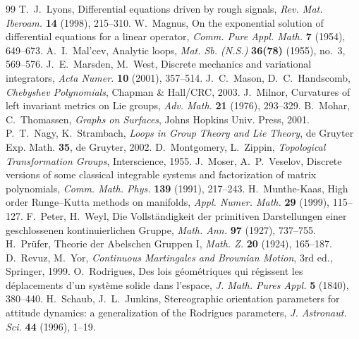 \documentclass[11pt,reqno]{amsart}
\theoremstyle{definition}
\theoremstyle{remark}
\numberwithin{equation}{section}
\begin{document}
\begin{thebibliography}{99}
 T.~J.~Lyons, Differential equations driven by rough signals, \emph{Rev. Mat. Iberoam.} \textbf{14} (1998), 215--310.
 W.~Magnus, On the exponential solution of differential equations for a linear operator, \emph{Comm. Pure Appl. Math.} \textbf{7} (1954), 649--673.
 A.~I.~Mal'cev, Analytic loops, \emph{Mat. Sb. (N.S.)} \textbf{36(78)} (1955), no.~3, 569--576.
 J.~E.~Marsden, M.~West, Discrete mechanics and variational integrators, \emph{Acta Numer.} \textbf{10} (2001), 357--514.
 J.~C.~Mason, D.~C.~Handscomb, \emph{Chebyshev Polynomials}, Chapman \& Hall/CRC, 2003.
 J.~Milnor, Curvatures of left invariant metrics on Lie groups, \emph{Adv. Math.} \textbf{21} (1976), 293--329.
 B.~Mohar, C.~Thomassen, \emph{Graphs on Surfaces}, Johns Hopkins Univ. Press, 2001.
 P.~T.~Nagy, K.~Strambach, \emph{Loops in Group Theory and Lie Theory}, de Gruyter Exp. Math. \textbf{35}, de Gruyter, 2002.
 D.~Montgomery, L.~Zippin, \emph{Topological Transformation Groups}, Interscience, 1955.
 J.~Moser, A.~P.~Veselov, Discrete versions of some classical integrable systems and factorization of matrix polynomials, \emph{Comm. Math. Phys.} \textbf{139} (1991), 217--243.
 H.~Munthe-Kaas, High order Runge--Kutta methods on manifolds, \emph{Appl. Numer. Math.} \textbf{29} (1999), 115--127.
 F.~Peter, H.~Weyl, Die Vollst\"andigkeit der primitiven Darstellungen einer geschlossenen kontinuierlichen Gruppe, \emph{Math. Ann.} \textbf{97} (1927), 737--755.
 H.~Pr\"ufer, Theorie der Abelschen Gruppen I, \emph{Math. Z.} \textbf{20} (1924), 165--187.
 D.~Revuz, M.~Yor, \emph{Continuous Martingales and Brownian Motion}, 3rd ed., Springer, 1999.
 O.~Rodrigues, Des lois g\'eom\'etriques qui r\'egissent les d\'eplacements d'un syst\`eme solide dans l'espace, \emph{J. Math. Pures Appl.} \textbf{5} (1840), 380--440.
 H.~Schaub, J.~L.~Junkins, Stereographic orientation parameters for attitude dynamics: a generalization of the Rodrigues parameters, \emph{J. Astronaut. Sci.} \textbf{44} (1996), 1--19.

\end{thebibliography}
\end{document}
